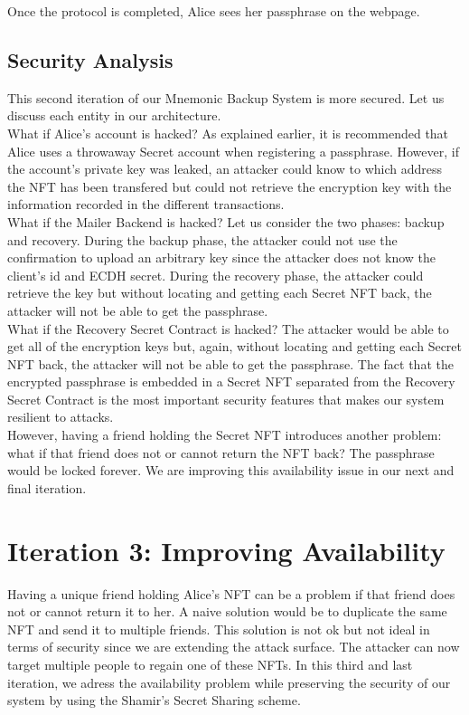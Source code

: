 \documentclass[12pt]{article}
\begin{document}
Once the protocol is completed, Alice sees her passphrase on the webpage.

\subsection{Security Analysis}

This second iteration of our Mnemonic Backup System is more secured. Let us discuss each entity in our architecture. \\

What if Alice's account is hacked? As explained earlier, it is recommended that Alice uses a throwaway Secret account when registering a passphrase. However, if the account's private key was leaked, an attacker could know to which address the NFT has been transfered but could not retrieve the encryption key with the information recorded in the different transactions. \\

What if the Mailer Backend is hacked? Let us consider the two phases: backup and recovery. During the backup phase, the attacker could not use the confirmation to upload an arbitrary key since the attacker does not know the client's id and ECDH secret. During the recovery phase, the attacker could retrieve the key but without locating and getting each Secret NFT back, the attacker will not be able to get the passphrase. \\

What if the Recovery Secret Contract is hacked? The attacker would be able to get all of the encryption keys but, again, without locating and getting each Secret NFT back, the attacker will not be able to get the passphrase. The fact that the encrypted passphrase is embedded in a Secret NFT separated from the Recovery Secret Contract is the most important security features that makes our system resilient to attacks. \\

However, having a friend holding the Secret NFT introduces another problem: what if that friend does not or cannot return the NFT back? The passphrase would be locked forever. We are improving this availability issue in our next and final iteration. 

\section{Iteration 3: Improving Availability}
\label{iteration3}

Having a unique friend holding Alice's NFT can be a problem if that friend does not or cannot return it to her. A naive solution would be to duplicate the same NFT and send it to multiple friends. This solution is not ok but not ideal in terms of security since we are extending the attack surface. The attacker can now target multiple people to regain one of these NFTs. In this third and last iteration, we adress the availability problem while preserving the security of our system by using the Shamir's Secret Sharing scheme. 
\end{document}
